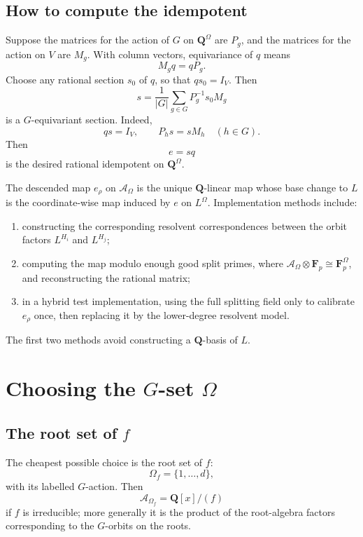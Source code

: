 \documentclass[11pt]{article}
\newcommand{\QQ}{\mathbf{Q}}
\newcommand{\cA}{\mathcal{A}}
\begin{document}
\subsection{How to compute the idempotent}

Suppose the matrices for the action of $G$ on $\QQ^\Omega$ are $P_g$, and the
matrices for the action on $V$ are $M_g$.  With column vectors, equivariance of
$q$ means
\begin{equation}
  M_g q=qP_g.
  \label{eq:q-equivariance}
\end{equation}
Choose any rational section $s_0$ of $q$, so that $qs_0=I_V$.  Then
\begin{equation}
  s=\frac{1}{|G|}\sum_{g\in G}P_g^{-1}s_0M_g
  \label{eq:averaged-section}
\end{equation}
is a $G$-equivariant section.  Indeed,
\[
  qs=I_V,
  \qquad
  P_hs=sM_h\quad(h\in G).
\]
Then
\[
  e=sq
\]
is the desired rational idempotent on $\QQ^\Omega$.

The descended map $e_\rho$ on $\cA_\Omega$ is the unique $\QQ$-linear map whose
base change to $L$ is the coordinate-wise map induced by $e$ on $L^\Omega$.
Implementation methods include:
\begin{enumerate}
\item constructing the corresponding resolvent correspondences between the orbit
factors $L^{H_i}$ and $L^{H_j}$;
\item computing the map modulo enough good split primes, where
$\cA_\Omega\otimes\mathbf F_p\cong \mathbf F_p^\Omega$, and reconstructing the
rational matrix;
\item in a hybrid test implementation, using the full splitting field only to
calibrate $e_\rho$ once, then replacing it by the lower-degree resolvent model.
\end{enumerate}
The first two methods avoid constructing a $\QQ$-basis of $L$.

\section{Choosing the $G$-set $\Omega$}

\subsection{The root set of $f$}

The cheapest possible choice is the root set of $f$:
\[
  \Omega_f=\{1,\ldots,d\},
\]
with its labelled $G$-action.  Then
\[
  \cA_{\Omega_f}=\QQ[x]/(f)
\]
if $f$ is irreducible; more generally it is the product of the root-algebra factors
corresponding to the $G$-orbits on the roots.
\end{document}
